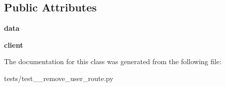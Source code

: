 \subsection*{Public Attributes}
\begin{DoxyCompactItemize}
\item 
\mbox{\label{classtests_1_1test__11__remove__user__route_1_1_test_user_routes_af1719a725bf8d7f997da8e8a1fe75aa3}} 
{\bfseries data}
\item 
\mbox{\label{classtests_1_1test__11__remove__user__route_1_1_test_user_routes_a988138cd2400f5634364416f4bacbc49}} 
{\bfseries client}
\end{DoxyCompactItemize}


The documentation for this class was generated from the following file\+:\begin{DoxyCompactItemize}
\item 
tests/test\+\_\+\_\+remove\+\_\+user\+\_\+route.\+py\end{DoxyCompactItemize}
